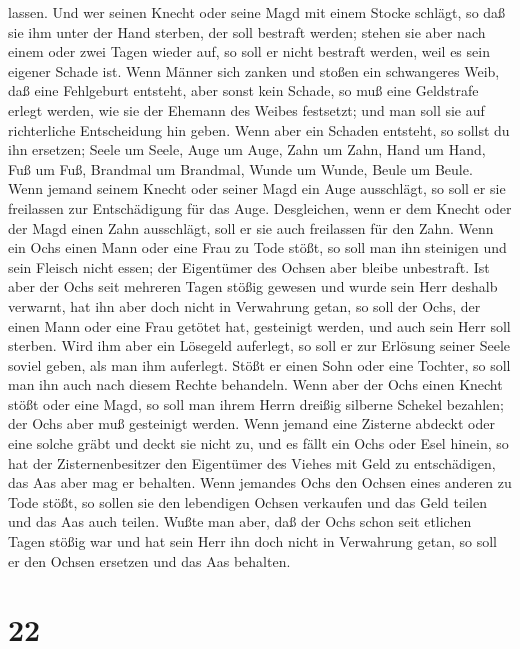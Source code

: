 lassen.  Und wer seinen Knecht oder seine Magd mit einem
Stocke schlägt, so daß sie ihm unter der Hand sterben, der soll bestraft
werden;  stehen sie aber nach einem oder zwei Tagen
wieder auf, so soll er nicht bestraft werden, weil es sein eigener
Schade ist.  Wenn Männer sich zanken und stoßen ein
schwangeres Weib, daß eine Fehlgeburt entsteht, aber sonst kein Schade,
so muß eine Geldstrafe erlegt werden, wie sie der Ehemann des Weibes
festsetzt; und man soll sie auf richterliche Entscheidung hin geben.
 Wenn aber ein Schaden entsteht, so sollst du ihn
ersetzen; Seele um Seele,  Auge um Auge, Zahn um Zahn,
Hand um Hand, Fuß um Fuß,  Brandmal um Brandmal, Wunde um
Wunde, Beule um Beule.  Wenn jemand seinem Knecht oder
seiner Magd ein Auge ausschlägt, so soll er sie freilassen zur
Entschädigung für das Auge.  Desgleichen, wenn er dem
Knecht oder der Magd einen Zahn ausschlägt, soll er sie auch freilassen
für den Zahn.  Wenn ein Ochs einen Mann oder eine Frau zu
Tode stößt, so soll man ihn steinigen und sein Fleisch nicht essen; der
Eigentümer des Ochsen aber bleibe unbestraft.  Ist aber
der Ochs seit mehreren Tagen stößig gewesen und wurde sein Herr deshalb
verwarnt, hat ihn aber doch nicht in Verwahrung getan, so soll der Ochs,
der einen Mann oder eine Frau getötet hat, gesteinigt werden, und auch
sein Herr soll sterben.  Wird ihm aber ein Lösegeld
auferlegt, so soll er zur Erlösung seiner Seele soviel geben, als man
ihm auferlegt.  Stößt er einen Sohn oder eine Tochter, so
soll man ihn auch nach diesem Rechte behandeln.  Wenn
aber der Ochs einen Knecht stößt oder eine Magd, so soll man ihrem Herrn
dreißig silberne Schekel bezahlen; der Ochs aber muß gesteinigt werden.
 Wenn jemand eine Zisterne abdeckt oder eine solche gräbt
und deckt sie nicht zu, und es fällt ein Ochs oder Esel hinein,
 so hat der Zisternenbesitzer den Eigentümer des Viehes
mit Geld zu entschädigen, das Aas aber mag er behalten. 
Wenn jemandes Ochs den Ochsen eines anderen zu Tode stößt, so sollen sie
den lebendigen Ochsen verkaufen und das Geld teilen und das Aas auch
teilen.  Wußte man aber, daß der Ochs schon seit etlichen
Tagen stößig war und hat sein Herr ihn doch nicht in Verwahrung getan,
so soll er den Ochsen ersetzen und das Aas behalten.

\hypertarget{section-21}{%
\section{22}\label{section-21}}

